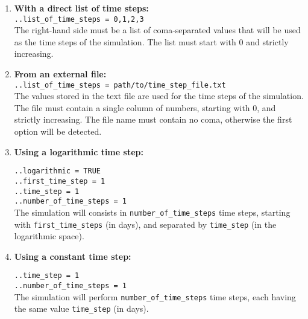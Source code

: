 \documentclass[10pt]{article}
\begin{document}
	\eject


\begin{enumerate}
	\item \textbf{With a direct list of time steps:}\\

	\noindent \verb+..list_of_time_steps = 0,1,2,3+ \\	

	The right-hand side must be a list of coma-separated values that will be used as the time steps of the simulation.
	The list must start with 0 and strictly increasing.\\

	\item \textbf{From an external file:}\\
	
	\noindent \verb+..list_of_time_steps = path/to/time_step_file.txt+ \\	
	
	The values stored in the text file are used for the time steps of the simulation. 
	The file must contain a single column of numbers, starting with 0, and strictly increasing.
	The file name must contain no coma, otherwise the first option will be detected.
	
	\item \textbf{Using a logarithmic time step:\\} 

	\noindent \verb+..logarithmic = TRUE+ \\	
	\verb+..first_time_step = 1+\\
	\verb+..time_step = 1+\\
	\verb+..number_of_time_steps = 1+\\

	The simulation will consists in \verb+number_of_time_steps+ time steps, starting with \verb+first_time_steps+ (in days), and separated by \verb+time_step+ (in the logarithmic space).
	
    \eject	
	
	\item \textbf{Using a constant time step:\\}

	\noindent \verb+..time_step = 1+\\
	\verb+..number_of_time_steps = 1+\\

	The simulation will perform \verb+number_of_time_steps+ time steps, each having the same value \verb+time_step+ (in days).

\end{enumerate}
\end{document}
